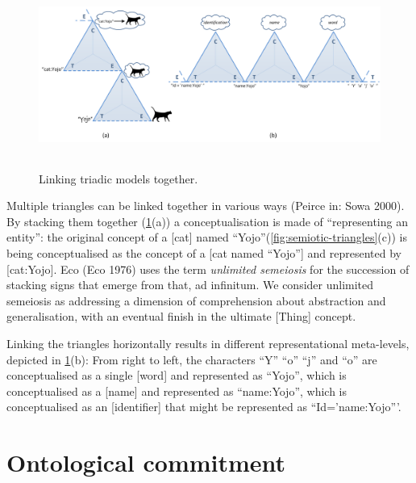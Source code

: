\documentclass[a4paper,11pt,oneside,oldfontcommands]{memoir}
\theoremstyle{definition}
\theoremstyle{break}		%
\numberwithin{equation}{chapter}
\numberwithin{figure}{chapter}
\begin{document}
\begin{figure}
\hypertarget{fig:linked-triangles}{%
\centering
\includegraphics[width=6.25in,height=2.39583in]{src/images/LinkedTriangles.png}
\caption{Linking triadic models together.}\label{fig:linked-triangles}
}
\end{figure}

Multiple triangles can be linked together in various ways (Peirce in:
Sowa 2000). By stacking them together (\cref{fig:linked-triangles}(a)) a
conceptualisation is made of ``representing an entity'': the original
concept of a {[}\textbar{}cat{]} named
``Yojo''(\cref{fig:semiotic-triangles}(c)) is being conceptualised as
the concept of a {[}\textbar{}cat named ``Yojo''{]} and represented by
{[}\textbar{}cat:Yojo{]}. Eco (Eco 1976) uses the term \emph{unlimited
semeiosis} for the succession of stacking signs that emerge from that,
ad infinitum. We consider unlimited semeiosis as addressing a dimension
of comprehension about abstraction and generalisation, with an eventual
finish in the ultimate {[}\textbar{}Thing{]} concept.

Linking the triangles horizontally results in different representational
meta-levels, depicted in \cref{fig:linked-triangles}(b): From right to
left, the characters ``Y'' ``o'' ``j'' and ``o'' are conceptualised as a
single {[}\textbar{}word{]} and represented as ``Yojo'', which is
conceptualised as a {[}\textbar{}name{]} and represented as
``name:Yojo'', which is conceptualised as an {[}\textbar{}identifier{]}
that might be represented as ``Id='name:Yojo'''.

\hypertarget{ontological-commitment}{%
\section{Ontological commitment}\label{ontological-commitment}}
\end{document}
